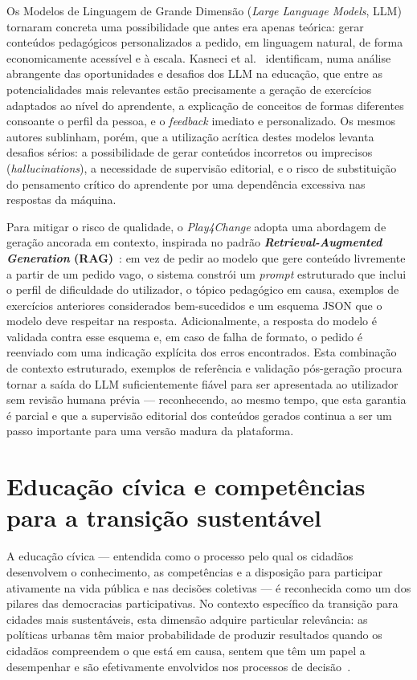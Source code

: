 \begin{sloppypar}
Os Modelos de Linguagem de Grande Dimensão (\emph{Large Language Models}, LLM) tornaram concreta uma possibilidade que antes era apenas teórica: gerar conteúdos pedagógicos personalizados a pedido, em linguagem natural, de forma economicamente acessível e à escala. Kasneci et al.~\cite{kasneci2023chatgpt} identificam, numa análise abrangente das oportunidades e desafios dos LLM na educação, que entre as potencialidades mais relevantes estão precisamente a geração de exercícios adaptados ao nível do aprendente, a explicação de conceitos de formas diferentes consoante o perfil da pessoa, e o \emph{feedback} imediato e personalizado. Os mesmos autores sublinham, porém, que a utilização acrítica destes modelos levanta desafios sérios: a possibilidade de gerar conteúdos incorretos ou imprecisos (\emph{hallucinations}), a necessidade de supervisão editorial, e o risco de substituição do pensamento crítico do aprendente por uma dependência excessiva nas respostas da máquina.
\end{sloppypar}

Para mitigar o risco de qualidade, o \emph{Play4Change} adopta uma abordagem de geração ancorada em contexto, inspirada no padrão \textbf{\emph{Retrieval-Augmented Generation} (RAG)}~\cite{lewis2020rag}: em vez de pedir ao modelo que gere conteúdo livremente a partir de um pedido vago, o sistema constrói um \emph{prompt} estruturado que inclui o perfil de dificuldade do utilizador, o tópico pedagógico em causa, exemplos de exercícios anteriores considerados bem-sucedidos e um esquema JSON que o modelo deve respeitar na resposta. Adicionalmente, a resposta do modelo é validada contra esse esquema e, em caso de falha de formato, o pedido é reenviado com uma indicação explícita dos erros encontrados. Esta combinação de contexto estruturado, exemplos de referência e validação pós-geração procura tornar a saída do LLM suficientemente fiável para ser apresentada ao utilizador sem revisão humana prévia --- reconhecendo, ao mesmo tempo, que esta garantia é parcial e que a supervisão editorial dos conteúdos gerados continua a ser um passo importante para uma versão madura da plataforma.

\section{Educação cívica e competências para a transição sustentável}
\label{sec:educacao-civica}

A educação cívica --- entendida como o processo pelo qual os cidadãos desenvolvem o conhecimento, as competências e a disposição para participar ativamente na vida pública e nas decisões coletivas --- é reconhecida como um dos pilares das democracias participativas. No contexto específico da transição para cidades mais sustentáveis, esta dimensão adquire particular relevância: as políticas urbanas têm maior probabilidade de produzir resultados quando os cidadãos compreendem o que está em causa, sentem que têm um papel a desempenhar e são efetivamente envolvidos nos processos de decisão~\citep{ureka2026alliance}.

